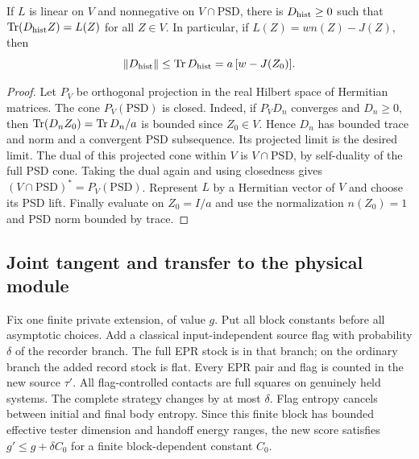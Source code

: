 \begin{lemma}\label{to:sc-lem:dual}
If $L$ is linear on $V$ and nonnegative on $V\cap\mathrm{PSD}$, there is $D_{\rm hist}\ge0$ such that $\operatorname{Tr}(D_{\rm hist}Z)=L(Z)$ for all $Z\in V$. In particular, if $L(Z)=w n(Z)-J(Z)$, then
\[
\|D_{\rm hist}\|\le\operatorname{Tr} D_{\rm hist}=a\,[w-J(Z_0)].
\]
\end{lemma}
\begin{proof}
Let $P_V$ be orthogonal projection in the real Hilbert space of Hermitian matrices. The cone $P_V(\mathrm{PSD})$ is closed. Indeed, if $P_VD_n$ converges and $D_n\ge0$, then $\operatorname{Tr}(D_nZ_0)=\operatorname{Tr} D_n/a$ is bounded since $Z_0\in V$. Hence $D_n$ has bounded trace and norm and a convergent PSD subsequence. Its projected limit is the desired limit. The dual of this projected cone within $V$ is $V\cap\mathrm{PSD}$, by self-duality of the full PSD cone. Taking the dual again and using closedness gives $(V\cap\mathrm{PSD})^*=P_V(\mathrm{PSD})$. Represent $L$ by a Hermitian vector of $V$ and choose its PSD lift. Finally evaluate on $Z_0=I/a$ and use the normalization $n(Z_0)=1$ and PSD norm bounded by trace.
\end{proof}

\subsection{Joint tangent and transfer to the physical module}
Fix one finite private extension, of value $g$. Put all block constants before all asymptotic choices. Add a classical input-independent source flag with probability $\delta$ of the recorder branch. The full EPR stock is in that branch; on the ordinary branch the added record stock is flat. Every EPR pair and flag is counted in the new source $\tau'$. All flag-controlled contacts are full squares on genuinely held systems. The complete strategy changes by at most $\delta$. Flag entropy cancels between initial and final body entropy. Since this finite block has bounded effective tester dimension and handoff energy ranges, the new score satisfies $g'\le g+\delta C_0$ for a finite block-dependent constant $C_0$.

